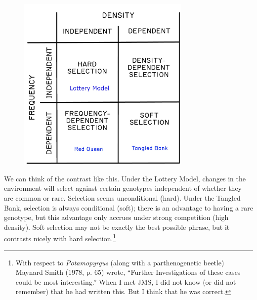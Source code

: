 \documentclass[
  letterpaper,
]{book}
\begin{document}
\begin{figure}


{\centering \includegraphics[width=0.75\textwidth,height=\textheight]{images/fig2-2.jpeg}

}

\end{figure}

We can think of the contrast like this. Under the Lottery Model, changes
in the environment will select against certain genotypes independent of
whether they are common or rare. Selection seems unconditional (hard).
Under the Tangled Bank, selection is always conditional (soft); there is
an advantage to having a rare genotype, but this advantage only accrues
under strong competition (high density). Soft selection may not be
exactly the best possible phrase, but it contrasts nicely with hard
selection.\footnote{With respect to \emph{Potamopyrgus} (along with a
  parthenogenetic beetle) Maynard Smith (1978, p. 65) wrote, ``Further
  Investigations of these cases could be most interesting.'' When I met
  JMS, I did not know (or did not remember) that he had written this.
  But I think that he was correct.}
\end{document}
